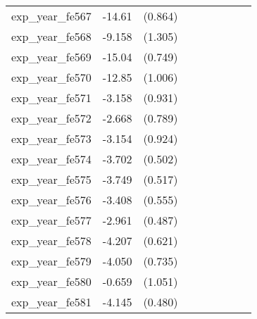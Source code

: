 {\begin{tabular}{l*{4}{cc}}
exp\_year\_fe567&   -14.61\sym{***}&  (0.864)&                  &         &                  &         &                  &         \\
exp\_year\_fe568&   -9.158\sym{***}&  (1.305)&                  &         &                  &         &                  &         \\
exp\_year\_fe569&   -15.04\sym{***}&  (0.749)&                  &         &                  &         &                  &         \\
exp\_year\_fe570&   -12.85\sym{***}&  (1.006)&                  &         &                  &         &                  &         \\
exp\_year\_fe571&   -3.158\sym{***}&  (0.931)&                  &         &                  &         &                  &         \\
exp\_year\_fe572&   -2.668\sym{***}&  (0.789)&                  &         &                  &         &                  &         \\
exp\_year\_fe573&   -3.154\sym{***}&  (0.924)&                  &         &                  &         &                  &         \\
exp\_year\_fe574&   -3.702\sym{***}&  (0.502)&                  &         &                  &         &                  &         \\
exp\_year\_fe575&   -3.749\sym{***}&  (0.517)&                  &         &                  &         &                  &         \\
exp\_year\_fe576&   -3.408\sym{***}&  (0.555)&                  &         &                  &         &                  &         \\
exp\_year\_fe577&   -2.961\sym{***}&  (0.487)&                  &         &                  &         &                  &         \\
exp\_year\_fe578&   -4.207\sym{***}&  (0.621)&                  &         &                  &         &                  &         \\
exp\_year\_fe579&   -4.050\sym{***}&  (0.735)&                  &         &                  &         &                  &         \\
exp\_year\_fe580&   -0.659         &  (1.051)&                  &         &                  &         &                  &         \\
exp\_year\_fe581&   -4.145\sym{***}&  (0.480)&                  &         &                  &         &                  &         \\

\end{tabular}}
